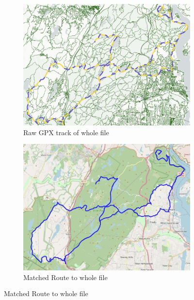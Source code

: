 \documentclass[11pt,a4paper]{article}
\begin{document}
\begin{figure}[H]
	\centering

	\begin{subfigure}[b]{0.48\textwidth}
		\centering
		\includegraphics[width=\textwidth]{track1_gpx.png}
		\caption{Raw GPX track of whole file}
		\label{fig:gpx1}
	\end{subfigure}
	\hfill
	\begin{subfigure}[b]{0.48\textwidth}
		\centering
		\includegraphics[width=\textwidth]{track1_route.png}
		\caption{Matched Route to whole file}
		\label{fig:route1}
	\end{subfigure}

	\par\bigskip %


\end{figure}
\end{document}
